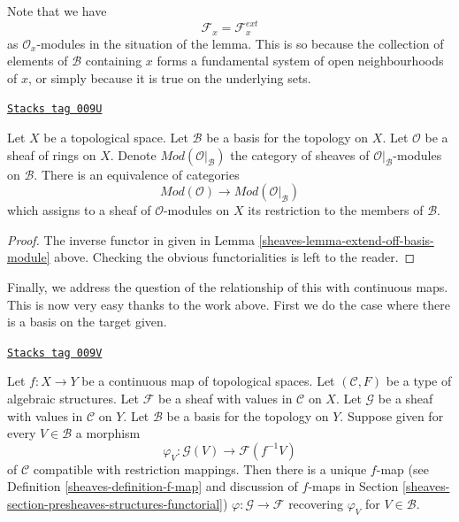 Note that we have
$$
\mathcal{F}_x = \mathcal{F}_x^{ext}
$$
as $\mathcal{O}_x$-modules in the situation of the lemma.
This is so because the collection of elements of $\mathcal{B}$ containing
$x$ forms a fundamental system of open neighbourhoods of $x$, or
simply because it is true on the underlying sets.

\begin{lemma}
\label{sheaves-lemma-restrict-basis-equivalence-modules}
\href{https://stacks.math.columbia.edu/tag/009U}{\texttt{Stacks tag 009U}}

Let $X$ be a topological space.
Let $\mathcal{B}$ be a basis for the topology on $X$.
Let $\mathcal{O}$ be a sheaf of rings on $X$.
Denote $\textit{Mod}(\mathcal{O}|_\mathcal{B})$ the category of
sheaves of $\mathcal{O}|_\mathcal{B}$-modules on $\mathcal{B}$.
There is an equivalence of categories
$$
\textit{Mod}(\mathcal{O})
\longrightarrow
\textit{Mod}(\mathcal{O}|_\mathcal{B})
$$
which assigns to a sheaf of $\mathcal{O}$-modules on $X$ its restriction to
the members of $\mathcal{B}$.
\end{lemma}

\begin{proof}

The inverse functor in given in
Lemma \ref{sheaves-lemma-extend-off-basis-module} above.
Checking the obvious functorialities is left to the reader.
\end{proof}

Finally, we address the question of the relationship of this with
continuous maps. This is now very easy thanks to the work
above. First we do the case where there is a basis on the
target given.

\begin{lemma}
\label{sheaves-lemma-f-map-basis-below-structures}
\href{https://stacks.math.columbia.edu/tag/009V}{\texttt{Stacks tag 009V}}

Let $f : X \to Y$ be a continuous map of topological spaces.
Let $(\mathcal{C}, F)$ be a type of algebraic structures.
Let $\mathcal{F}$ be a sheaf with values in $\mathcal{C}$ on $X$.
Let $\mathcal{G}$ be a sheaf with values in $\mathcal{C}$ on $Y$.
Let $\mathcal{B}$ be a basis for the topology on $Y$.
Suppose given for every $V \in \mathcal{B}$ a morphism
$$
\varphi_V :
\mathcal{G}(V)
\longrightarrow
\mathcal{F}(f^{-1}V)
$$
of $\mathcal{C}$ compatible with restriction mappings.
Then there is a unique $f$-map (see Definition \ref{sheaves-definition-f-map}
and discussion of $f$-maps in
Section \ref{sheaves-section-presheaves-structures-functorial})
$\varphi : \mathcal{G} \to \mathcal{F}$
recovering $\varphi_V$ for $V \in \mathcal{B}$.
\end{lemma}

